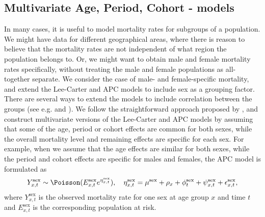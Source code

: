 \subsection{Multivariate Age, Period, Cohort - models}
\label{sec:multivariateAPC}
In many cases, it is useful to model mortality rates for subgroups of a population. We might have data for different geographical areas, where there is reason to believe that the mortality rates are not independent of what region the population belongs to. Or, we might want to obtain male and female mortality rates specifically, without treating the male and female populations as all-together separate. We consider the case of male- and female-specific mortality, and extend the Lee-Carter and APC models to include sex as a grouping factor. There are several ways to extend the models to include correlation between the groups (see e.g. \textcite{Wisniowski2015} and \textcite{RieblerHeldRue2012}). We follow the straightforward approach proposed by \textcite{rieblerHeld2010}, and construct multivariate versions of the Lee-Carter and APC models by assuming that some of the age, period or cohort effects are common for both sexes, while the overall mortality level and remaining effects are specific for each sex. For example, when we assume that the age effects are similar for both sexes, while the period and cohort effects are specific for males and females, the APC model is formulated as
\begin{equation}
    Y_{x,t}^{\text{sex}} \sim \Poisson(E_{x,t}^{\text{sex}}e^{\eta_{x,t}^{\text{sex}}}), \quad \eta_{x,t}^{\text{sex}} = \mu^{\text{sex}} + \rho_x + \phi_t^{\text{sex}} + \psi_{x,t}^{\text{sex}} + \epsilon_{x,t}^{\text{sex}},
\end{equation}
where $Y_{x,t}^{\text{sex}}$ is the observed mortality rate for one sex at age group $x$ and time $t$ and $E_{x,t}^{\text{sex}}$ is the corresponding population at risk. 